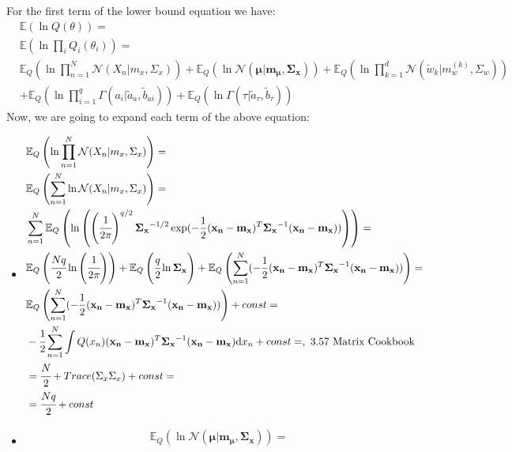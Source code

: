\documentclass[11pt,notitlepage]{article}
\begin{document}
For the first term of the lower bound equation we have:
\begin{align*}
& \mathbb{E}(\ln Q(\theta)) =\\
& \mathbb{E}(\ln \prod_i Q_i(\theta_i)) =\\
& \mathbb{E}_Q \left( \ln \prod_{n=1}^N \mathcal{N}(X_n|m_x,\Sigma_x)\right) + \mathbb{E}_Q \left( \ln \mathcal{N}(\mathbf{\mu}|\mathbf{m_{\mu}, \mathbf{\Sigma}_x})\right) + \mathbb{E}_Q \left( \ln \prod_{k=1}^d \mathcal{N} (\tilde{w}_k|m_w^{(k)},\Sigma_w)\right)\\
&+ \mathbb{E}_Q \left( \ln \prod_{i=1}^q \Gamma (a_i | \tilde{a}_a, \tilde{b}_{ai})\right) + \mathbb{E}_Q \left( \ln \Gamma (\tau | \tilde{a}_{\tau}, \tilde{b}_{\tau})\right)
\end{align*}
Now, we are going to expand each term of the above equation:
\begin{itemize}
\item 
\begin{align*}
&\mathbb{E}_Q \left( \ln \prod_{n=1}^N \mathcal{N}(X_n|m_x,\Sigma_x)\right) = \\
&\mathbb{E}_Q \left(\sum_{n=1}^N \ln \mathcal{N}(X_n|m_x,\Sigma_x) \right)=\\
&\sum_{n=1}^N \mathbb{E}_Q \left( \ln \left( \left( \cfrac{1}{2\pi}\right)^{q/2} \mathbf{\Sigma_x}^{-1/2} \exp (-\frac{1}{2}(\mathbf{x_n} - \mathbf{m_x})^T \mathbf{\Sigma_x}^{-1}(\mathbf{x_n} - \mathbf{m_x}) )\right) \right)=\\
&\mathbb{E}_Q\left( \cfrac{Nq}{2}\ln \left( \cfrac{1}{2\pi} \right) \right) + \mathbb{E}_Q\left( \cfrac{q}{2} \ln \mathbf{\Sigma_x}  \right) + \mathbb{E}_Q\left( \sum_{n=1}^N (-\frac{1}{2}(\mathbf{x_n} - \mathbf{m_x})^T \mathbf{\Sigma_x}^{-1}(\mathbf{x_n} - \mathbf{m_x})) \right) = \\
&\mathbb{E}_Q\left( \sum_{n=1}^N (-\frac{1}{2}(\mathbf{x_n} - \mathbf{m_x})^T \mathbf{\Sigma_x}^{-1}(\mathbf{x_n} - \mathbf{m_x})) \right) + const = \\
&-\cfrac{1}{2} \sum_{n=1}^N \int Q(x_n) (\mathbf{x_n} - \mathbf{m_x})^T \mathbf{\Sigma_x}^{-1}(\mathbf{x_n} - \mathbf{m_x})\mathrm{d}x_n + const =,\text{ 3.57 Matrix Cookbook}\\
&= \cfrac{N}{2} + Trace(\Sigma_x \Sigma_x) + const = \\
&= \cfrac{Nq}{2} +const
\end{align*}
\item 
\begin{align*}
& \mathbb{E}_Q \left( \ln \mathcal{N}(\mathbf{\mu}|\mathbf{m_{\mu}, \mathbf{\Sigma}_x})\right) = \\
&\\
\end{align*}
\end{itemize}
\end{document}
